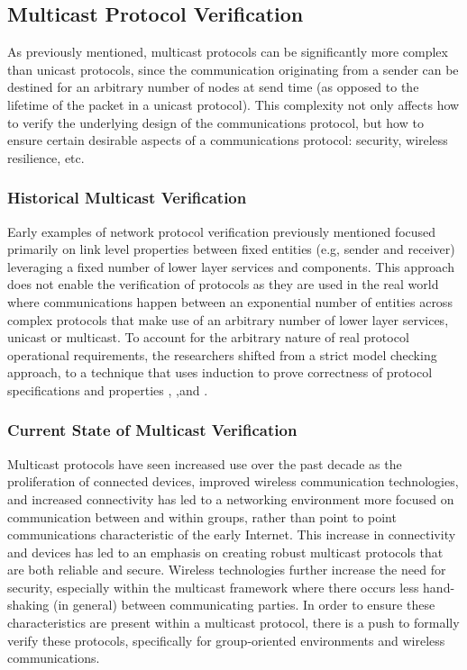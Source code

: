 \documentclass[10pt, journal]{IEEEtran}
\begin{document}
\subsection{Multicast Protocol Verification}
As previously mentioned, multicast protocols can be significantly more complex than unicast protocols, since the communication originating from a sender can be destined for an arbitrary number of nodes at send time (as opposed to the lifetime of the packet in a unicast protocol). This complexity not only affects how to verify the underlying design of the communications protocol, but how to ensure certain desirable aspects of a communications protocol: security, wireless resilience, etc.

\subsubsection{Historical Multicast Verification}
Early examples of network protocol verification previously mentioned focused primarily on link level properties between fixed entities (e.g, sender and receiver) leveraging a fixed number of lower layer services and components. This approach does not enable the verification of protocols as they are used in the real world where communications happen between an exponential number of entities across complex protocols that make use of an arbitrary number of lower layer services, unicast or multicast. To account for the arbitrary nature of real protocol operational requirements, the researchers shifted from a strict model checking approach, to a technique that uses induction to prove correctness of protocol specifications and properties \cite{Creese1999}, \cite{Callahan1995} ,and \cite{Baptista1990}.

\subsubsection{Current State of Multicast Verification}
Multicast protocols have seen increased use over the past decade as the proliferation of connected devices, improved wireless communication technologies, and increased connectivity has led to a networking environment more focused on communication between and within groups, rather than point to point communications characteristic of the early Internet. This increase in connectivity and devices has led to an emphasis on creating robust multicast protocols that are both reliable and secure. Wireless technologies further increase the need for security, especially within the multicast framework where there occurs less hand-shaking (in general) between communicating parties. In order to ensure these characteristics are present within a multicast protocol, there is a push to formally verify these protocols, specifically for group-oriented environments and wireless communications. 
\end{document}

